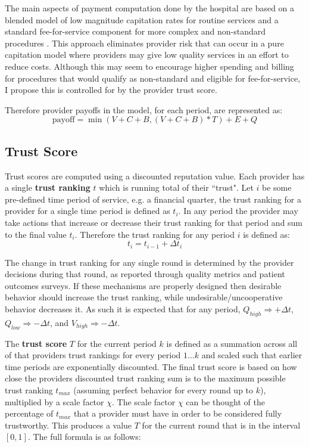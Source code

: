 \documentclass{article}
\begin{document}
The main aspects of payment computation done by the hospital are based on a blended model of low magnitude capitation rates for routine services and a standard fee-for-service component for more complex and non-standard procedures \cite{blended}. This approach eliminates provider risk that can occur in a pure capitation model where providers may give low quality services in an effort to reduce costs. Although this may seem to encourage higher spending and billing for procedures that would qualify as non-standard and eligible for fee-for-service, I propose this is controlled for by the provider trust score.

Therefore provider payoffs in the model, for each period, are represented as:
\begin{equation} \label{eq:ptnm}
    \text{payoff} = \min(V + C + B, (V + C + B) * T) + E + Q
\end{equation}

\subsection{Trust Score} \label{sec:trustscore}
Trust scores are computed using a discounted reputation value. Each provider has a single \textbf{trust ranking} $t$ which is running total of their ``trust". Let $i$ be some pre-defined time period of service, e.g. a financial quarter, the trust ranking for a provider for a single time period is defined as $t_i$. In any period the provider may take actions that increase or decrease their trust ranking for that period and sum to the final value $t_i$. Therefore the trust ranking for any period $i$ is defined as:
\begin{equation}
    t_i = t_{i - 1} + \Delta t_i
\end{equation}

The change in trust ranking for any single round is determined by the provider decisions during that round, as reported through quality metrics and patient outcomes surveys. If these mechanisms are properly designed then desirable behavior should increase the trust ranking, while undesirable/uncooperative behavior decreases it. As such it is expected that for any period, $Q_{high} \Rightarrow +\Delta t$, $Q_{low} \Rightarrow -\Delta t$, and $V_{high} \Rightarrow -\Delta t$.

The \textbf{trust score} $T$ for the current period $k$ is defined as a summation across all of that providers trust rankings for every period $1 \dots k$ and scaled such that earlier time periods are exponentially discounted. The final trust score is based on how close the providers discounted trust ranking sum is to the maximum possible trust ranking $t_{max}$ (assuming perfect behavior for every round up to $k$), multiplied by a scale factor $\chi$. The scale factor $\chi$ can be thought of the percentage of $t_{max}$ that a provider must have in order to be considered fully trustworthy. This produces a value $T$ for the current round that is in the interval $[0, 1]$. The full formula is as follows:
\end{document}
